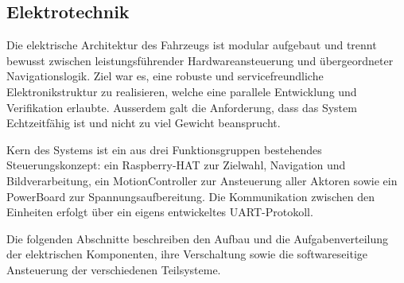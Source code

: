\documentclass[main.tex]{subfiles} %
\begin{document}

\subsection{Elektrotechnik}

Die elektrische Architektur des Fahrzeugs ist modular aufgebaut und trennt bewusst 
zwischen leistungsführender Hardwareansteuerung und übergeordneter Navigationslogik. 
Ziel war es, eine robuste und servicefreundliche Elektronikstruktur 
zu realisieren, welche eine parallele Entwicklung und Verifikation erlaubte.
Ausserdem galt die Anforderung, dass das System Echtzeitfähig ist und nicht
zu viel Gewicht beansprucht.

Kern des Systems ist ein aus drei Funktionsgruppen bestehendes Steuerungskonzept: 
ein Raspberry-HAT zur Zielwahl, Navigation und Bildverarbeitung, ein MotionController zur 
Ansteuerung aller Aktoren sowie ein PowerBoard zur Spannungsaufbereitung. Die 
Kommunikation zwischen den Einheiten erfolgt über ein eigens entwickeltes 
UART-Protokoll.

Die folgenden Abschnitte beschreiben den Aufbau und die Aufgabenverteilung der 
elektrischen Komponenten, ihre Verschaltung sowie die softwareseitige Ansteuerung 
der verschiedenen Teilsysteme.


\newpage


\newpage


\newpage


\newpage


\newpage


\newpage


\newpage
\end{document}
